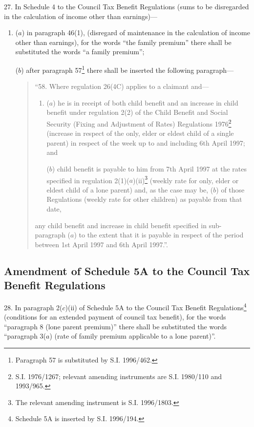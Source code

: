 \documentclass[a4paper]{article}
\begin{document}
27.  In Schedule 4 to the Council Tax Benefit Regulations (sums to be disregarded in the calculation of income other than earnings)—
\begin{enumerate}\item[]
($a$) in paragraph 46(1), (disregard of maintenance in the calculation of income other than earnings), for the words “the family premium” there shall be substituted the words “a family premium”;

($b$) after paragraph 57\footnote{\frenchspacing Paragraph 57 is substituted by S.I. 1996/462.} there shall be inserted the following paragraph—
\begin{quotation}
“58.  Where regulation 26(4C) applies to a claimant and—
\begin{enumerate}\item[]
($a$) he is in receipt of both child benefit and an increase in child benefit under regulation 2(2) of the Child Benefit and Social Security (Fixing and Adjustment of Rates) Regulations 1976\footnote{\frenchspacing S.I. 1976/1267; relevant amending instruments are S.I. 1980/110 and 1993/965.} (increase in respect of the only, elder or eldest child of a single parent) in respect of the week up to and including 6th April 1997; and

($b$) child benefit is payable to him from 7th April 1997 at the rates specified in regulation 2(1)($a$)(ii)\footnote{\frenchspacing The relevant amending instrument is S.I. 1996/1803.} (weekly rate for only, elder or eldest child of a lone parent) and, as the case may be, ($b$) of those Regulations (weekly rate for other children) as payable from that date,
\end{enumerate}
any child benefit and increase in child benefit specified in sub-paragraph ($a$) to the extent that it is payable in respect of the period between 1st April 1997 and 6th April 1997.”.
\end{quotation}
\end{enumerate}

\subsection[28. Amendment of Schedule 5A to the Council Tax Benefit Regulations]{Amendment of Schedule 5A to the Council Tax Benefit Regulations}

28.  In paragraph 2($c$)(ii) of Schedule 5A to the Council Tax Benefit Regulations\footnote{\frenchspacing Schedule 5A is inserted by S.I. 1996/194.} (conditions for an extended payment of council tax benefit), for the words “paragraph 8 (lone parent premium)” there shall be substituted the words “paragraph 3($a$) (rate of family premium applicable to a lone parent)”.
\end{document}
